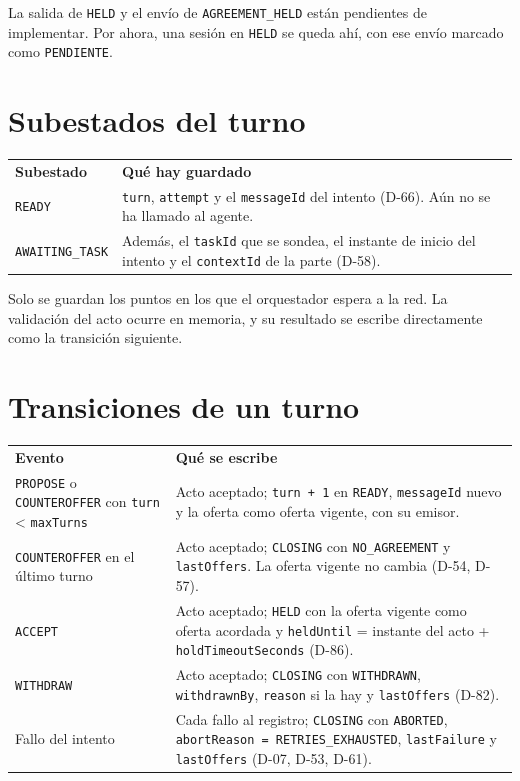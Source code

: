 La salida de \texttt{HELD} y el envío de \texttt{AGREEMENT\_HELD} están pendientes de implementar. Por ahora, una sesión en \texttt{HELD} se queda ahí, con ese envío marcado como \texttt{PENDIENTE}.

\section{Subestados del turno}

\begin{tabular}{p{3cm}p{10.5cm}}
  \textbf{Subestado} & \textbf{Qué hay guardado} \\
  \texttt{READY} & \texttt{turn}, \texttt{attempt} y el \texttt{messageId} del intento (D-66). Aún no se ha llamado al agente. \\
  \texttt{AWAITING\_TASK} & Además, el \texttt{taskId} que se sondea, el instante de inicio del intento y el \texttt{contextId} de la parte (D-58). \\
\end{tabular}

Solo se guardan los puntos en los que el orquestador espera a la red. La validación del acto ocurre en memoria, y su resultado se escribe directamente como la transición siguiente.

\section{Transiciones de un turno}

\begin{tabular}{p{5cm}p{8.5cm}}
  \textbf{Evento} & \textbf{Qué se escribe} \\
  \texttt{PROPOSE} o \texttt{COUNTEROFFER} con \texttt{turn} < \texttt{maxTurns} & Acto aceptado; \texttt{turn + 1} en \texttt{READY}, \texttt{messageId} nuevo y la oferta como oferta vigente, con su emisor. \\
  \texttt{COUNTEROFFER} en el último turno & Acto aceptado; \texttt{CLOSING} con \texttt{NO\_AGREEMENT} y \texttt{lastOffers}. La oferta vigente no cambia (D-54, D-57). \\
  \texttt{ACCEPT} & Acto aceptado; \texttt{HELD} con la oferta vigente como oferta acordada y \texttt{heldUntil} = instante del acto + \texttt{holdTimeoutSeconds} (D-86). \\
  \texttt{WITHDRAW} & Acto aceptado; \texttt{CLOSING} con \texttt{WITHDRAWN}, \texttt{withdrawnBy}, \texttt{reason} si la hay y \texttt{lastOffers} (D-82). \\
  Fallo del intento & Cada fallo al registro; \texttt{CLOSING} con \texttt{ABORTED}, \texttt{abortReason = RETRIES\_EXHAUSTED}, \texttt{lastFailure} y \texttt{lastOffers} (D-07, D-53, D-61). \\
\end{tabular}

